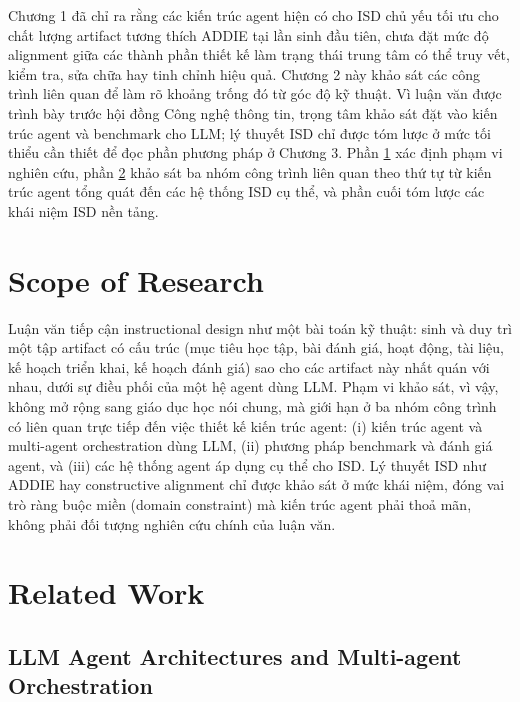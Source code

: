\documentclass[../main.tex]{subfiles}
\begin{document}
Chương 1 đã chỉ ra rằng các kiến trúc agent hiện có cho \gls{ISD} chủ yếu tối ưu cho chất lượng artifact tương thích ADDIE tại lần sinh đầu tiên, chưa đặt mức độ alignment giữa các thành phần thiết kế làm trạng thái trung tâm có thể truy vết, kiểm tra, sửa chữa hay tinh chỉnh hiệu quả. Chương 2 này khảo sát các công trình liên quan để làm rõ khoảng trống đó từ góc độ kỹ thuật. Vì luận văn được trình bày trước hội đồng Công nghệ thông tin, trọng tâm khảo sát đặt vào kiến trúc agent và benchmark cho LLM; lý thuyết ISD chỉ được tóm lược ở mức tối thiểu cần thiết để đọc phần phương pháp ở Chương 3. Phần \ref{sec:scope} xác định phạm vi nghiên cứu, phần \ref{sec:related-work} khảo sát ba nhóm công trình liên quan theo thứ tự từ kiến trúc agent tổng quát đến các hệ thống ISD cụ thể, và phần cuối tóm lược các khái niệm ISD nền tảng.

\section{Scope of Research}
\label{sec:scope}

Luận văn tiếp cận instructional design như một bài toán kỹ thuật: sinh và duy trì một tập artifact có cấu trúc (mục tiêu học tập, bài đánh giá, hoạt động, tài liệu, kế hoạch triển khai, kế hoạch đánh giá) sao cho các artifact này nhất quán với nhau, dưới sự điều phối của một hệ agent dùng LLM. Phạm vi khảo sát, vì vậy, không mở rộng sang giáo dục học nói chung, mà giới hạn ở ba nhóm công trình có liên quan trực tiếp đến việc thiết kế kiến trúc agent: (i) kiến trúc agent và multi-agent orchestration dùng LLM, (ii) phương pháp benchmark và đánh giá agent, và (iii) các hệ thống agent áp dụng cụ thể cho ISD. Lý thuyết ISD như ADDIE hay constructive alignment chỉ được khảo sát ở mức khái niệm, đóng vai trò ràng buộc miền (domain constraint) mà kiến trúc agent phải thoả mãn, không phải đối tượng nghiên cứu chính của luận văn.

\section{Related Work}
\label{sec:related-work}

\subsection{LLM Agent Architectures and Multi-agent Orchestration}
\end{document}
